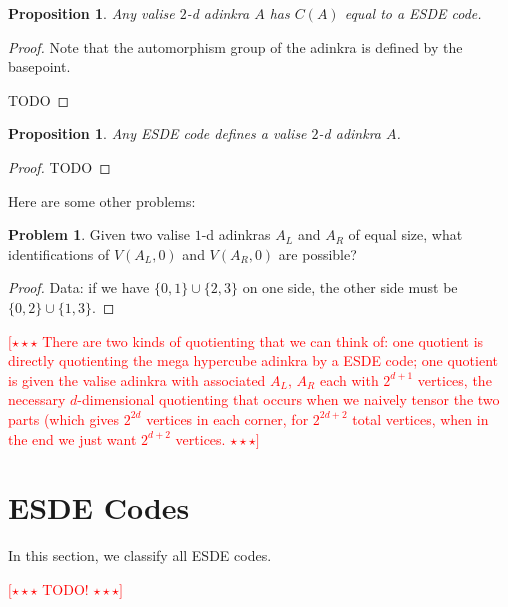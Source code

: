 \documentclass[12pt,twoside,singlespace]{article}
\numberwithin{equation}{section}
\newtheorem{prop}[equation]{Proposition}
\theoremstyle{definition}
\newtheorem{prob}{Problem}
\newcommand{\com}[1]{\textcolor{red}{$[\star \star \star$ #1 $\star \star \star]$}}
\begin{document}
\begin{prop}
Any valise $2$-d adinkra $A$ has $C(A)$ equal to a ESDE code.
\end{prop}
\begin{proof}

Note that the automorphism group of the adinkra is defined by the basepoint.

TODO
\end{proof}

\begin{prop}
Any ESDE code defines a valise $2$-d adinkra $A$.
\end{prop}
\begin{proof}
TODO
\end{proof}

Here are some other problems:
\begin{prob}
Given two valise $1$-d adinkras $A_L$ and $A_R$ of equal size, what identifications of $V(A_L, 0)$ and $V(A_R, 0)$ are possible?
\end{prob}
\begin{proof}
Data: if we have $\{0,1\} \cup \{2,3\}$ on one side, the other side must be $\{0,2\} \cup \{1, 3\}$.
\end{proof}

\com{There are two kinds of quotienting that we can think of: one quotient is directly quotienting the mega hypercube adinkra by a ESDE code; one quotient is given the valise adinkra with associated $A_L$, $A_R$ each with $2^{d+1}$ vertices, the necessary $d$-dimensional quotienting that occurs when we naively tensor the two parts (which gives $2^{2d}$ vertices in each corner, for $2^{2d+2}$ total vertices, when in the end we just want $2^{d+2}$ vertices.}

\section{ESDE Codes}

In this section, we classify all ESDE codes.

\com{TODO!}
\end{document}
